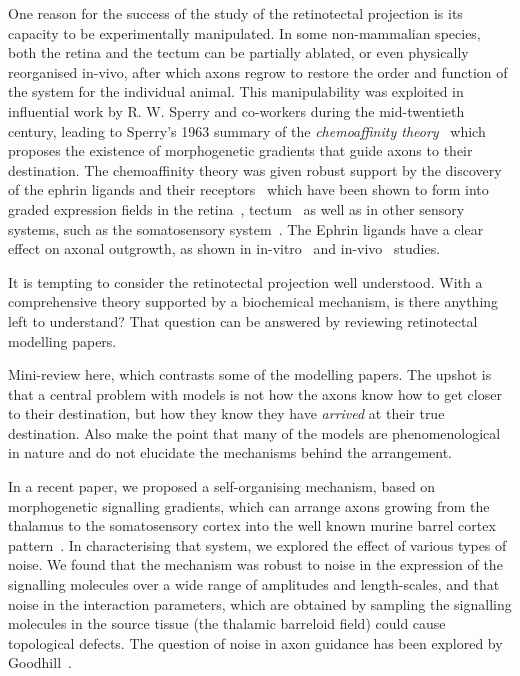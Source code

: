 \documentclass[11pt, a4paper]{article}
\begin{document}
One reason for the success of the study of the retinotectal projection is its
capacity to be experimentally manipulated. In some non-mammalian species, both
the retina and the tectum can be partially ablated, or even physically
reorganised in-vivo, after which axons regrow to restore the order and
function of the system for the individual animal. This manipulability was
exploited in influential work by R. W. Sperry and co-workers during the
mid-twentieth century, leading to Sperry's 1963 summary of
the \emph{chemoaffinity theory}~\cite{sperry_chemoaffinity_1963} which
proposes the existence of morphogenetic gradients that guide axons to their
destination. The chemoaffinity theory was given robust support by the
discovery of the ephrin ligands and their receptors~\cite{cheng_complementary_1995,drescher_vitro_1995}
which have been shown to form into graded expression fields in the
retina~\cite{braisted_graded_1997}, tectum~\cite{braisted_graded_1997,feldheim_genetic_2000} as well as in other
sensory systems, such as the somatosensory
system~\cite{vanderhaeghen_mapping_2000}. The Ephrin ligands have a clear
effect on axonal outgrowth, as shown in in-vitro~\cite{cheng_complementary_1995,drescher_vitro_1995,hansen_retinal_2004} and
in-vivo~\cite{rodger_transient_2000,mann_topographic_2002,hindges_ephb_2002} studies.
%
%
%
%
%
%
%
%

It is tempting to consider the retinotectal projection well understood. With a
comprehensive theory supported by a biochemical mechanism, is there anything
left to understand? That question can be answered by reviewing retinotectal
modelling papers.

Mini-review here, which contrasts some of the modelling papers. The upshot is
that a central problem with models is not how the axons know how to get closer
to their destination, but how they know they have \emph{arrived} at their true
destination. Also make the point that many of the models are phenomenological
in nature and do not elucidate the mechanisms behind the arrangement.

In a recent paper, we proposed a self-organising mechanism, based on
morphogenetic signalling gradients, which can arrange
axons growing from the thalamus to the somatosensory cortex into the well
known murine barrel cortex pattern~\cite{james_modelling_2020}. In
characterising that system, we explored the effect of various types of
noise. We found that the mechanism was robust to noise in the expression of
the signalling molecules over a wide range of amplitudes and length-scales,
and that noise in the interaction parameters, which are obtained by sampling
the signalling molecules in the source tissue (the thalamic barreloid field)
could cause topological defects. The question of noise in axon guidance has
been explored by Goodhill~\cite{goodhill_can_2016}.
\end{document}
